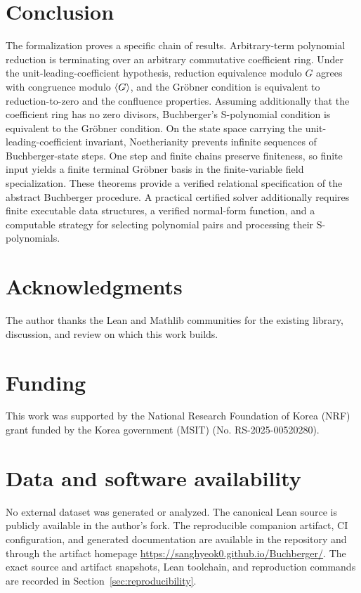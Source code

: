 \section{Conclusion}\label{sec:conclusion}

The formalization proves a specific chain of results.  Arbitrary-term
polynomial reduction is terminating over an arbitrary commutative coefficient
ring.  Under the unit-leading-coefficient hypothesis, reduction equivalence
modulo $G$ agrees with congruence modulo $\langle G \rangle$, and the Gr\"obner
condition is equivalent to reduction-to-zero and the confluence properties.
Assuming additionally that the coefficient ring has no zero divisors,
Buchberger's S-polynomial condition is equivalent to the Gr\"obner condition.
On the state space carrying the unit-leading-coefficient invariant,
Noetherianity prevents infinite sequences of Buchberger-state steps.  One step
and finite chains preserve finiteness, so finite input yields a finite terminal
Gr\"obner basis in the finite-variable field specialization.  These theorems
provide a verified relational specification of the abstract Buchberger
procedure.  A practical certified solver additionally requires finite
executable data structures, a verified normal-form function, and a computable
strategy for selecting polynomial pairs and processing their S-polynomials.

\section*{Acknowledgments}
The author thanks the Lean and Mathlib communities for the existing library,
discussion, and review on which this work builds.

\section*{Funding}
This work was supported by the National Research Foundation of Korea (NRF)
grant funded by the Korea government (MSIT) (No. RS-2025-00520280).

\section*{Data and software availability}
No external dataset was generated or analyzed.  The canonical Lean source is
publicly available in the author's  fork.  The reproducible
companion artifact, CI configuration, and generated documentation are
available in the  repository and through the artifact homepage
\url{https://sanghyeok0.github.io/Buchberger/}.  The exact source and artifact
snapshots, Lean toolchain, and reproduction commands are recorded in
Section~\ref{sec:reproducibility}.
